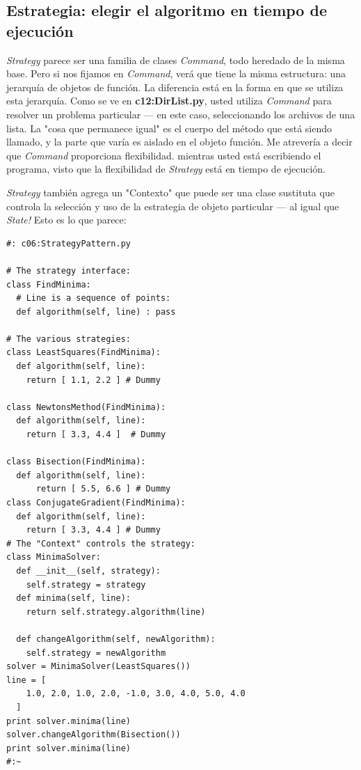 \documentclass{article}
\begin{document}
\subsection{Estrategia: elegir el algoritmo en tiempo de ejecución}

\textit{Strategy} parece ser una familia de clases \textit{Command}, todo heredado de la misma base. Pero si nos fijamos en \textit{Command}, verá que tiene la misma estructura: una jerarquía de objetos de función. La diferencia está en la forma en que se utiliza esta jerarquía. Como se ve en \textbf{c12:DirList.py}, usted utiliza \textit{Command} para resolver un problema particular — en este caso, seleccionando los archivos de una lista. La "cosa que permanece igual" es el cuerpo del método que está siendo llamado, y la parte que varía es aislado en el objeto función. Me atrevería a decir que \textit{Command} proporciona flexibilidad. mientras usted está escribiendo el programa, visto que la flexibilidad de \textit{Strategy} está en tiempo de ejecución. 

\textit{Strategy} también agrega un "Contexto" que puede ser una clase sustituta que controla la selección y uso de la estrategia de objeto particular — al igual que \textit{State!} Esto es lo que parece:   \newpage

\begin{lstlisting} 
#: c06:StrategyPattern.py 

# The strategy interface: 
class FindMinima: 
  # Line is a sequence of points: 
  def algorithm(self, line) : pass 
  
# The various strategies: 
class LeastSquares(FindMinima): 
  def algorithm(self, line): 
    return [ 1.1, 2.2 ] # Dummy 
    
class NewtonsMethod(FindMinima): 
  def algorithm(self, line): 
    return [ 3.3, 4.4 ]  # Dummy 
    
class Bisection(FindMinima): 
  def algorithm(self, line): 
      return [ 5.5, 6.6 ] # Dummy 
class ConjugateGradient(FindMinima): 
  def algorithm(self, line): 
    return [ 3.3, 4.4 ] # Dummy 
# The "Context" controls the strategy: 
class MinimaSolver: 
  def __init__(self, strategy): 
    self.strategy = strategy 
  def minima(self, line): 
    return self.strategy.algorithm(line) 
    
  def changeAlgorithm(self, newAlgorithm): 
    self.strategy = newAlgorithm 
solver = MinimaSolver(LeastSquares()) 
line = [ 
    1.0, 2.0, 1.0, 2.0, -1.0, 3.0, 4.0, 5.0, 4.0  
  ] 
print solver.minima(line) 
solver.changeAlgorithm(Bisection()) 
print solver.minima(line) 
#:~ 
\end{lstlisting}
\end{document}
